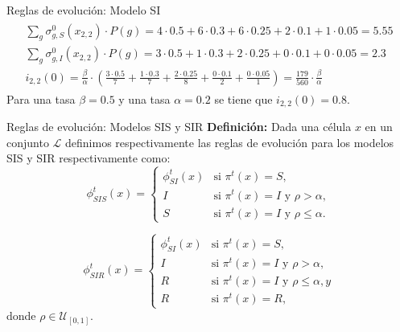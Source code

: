 \documentclass[9pt]{beamer}
\begin{document}
\begin{frame}{Reglas de evolución: Modelo SI}
\begin{align*}
    \begin{array}{l}
        \sum_g\sigma_{g,S}^0(x_{2,2})\cdot P(g) = 4\cdot0.5+6\cdot0.3+6\cdot0.25+2\cdot0.1+1\cdot0.05 = 5.55 \\
        \sum_g\sigma_{g,I}^0(x_{2,2})\cdot P(g) = 3\cdot0.5+1\cdot0.3+2\cdot0.25+0\cdot0.1+0\cdot0.05 = 2.3\\
        i_{2,2}(0) = \frac{\beta}{\alpha}\cdot\left(\frac{3\cdot0.5}{7}+\frac{1\cdot0.3}{7}+\frac{2\cdot0.25}{8}+\frac{0\cdot0.1}{2}+\frac{0\cdot0.05}{1}\right)=\frac{179}{560}\cdot\frac{\beta}{\alpha}
    \end{array}
\end{align*}
Para una tasa $\beta=0.5$ y una tasa $\alpha=0.2$ se tiene que $i_{2,2}(0)=0.8$.
\end{frame}

\begin{frame}{Reglas de evolución: Modelos SIS y SIR}
\textbf{Definición:} Dada una célula $x$ en un conjunto $\mathcal{L}$ definimos respectivamente las reglas de evolución para los modelos SIS y SIR respectivamente como:
\begin{equation}
    \phi_{SIS}^t(x)=\left\{\begin{array}{ll}
        \phi_{SI}^t(x) & \text{si }\pi^t(x) = S,\\
        I & \text{si }\pi^t(x)=I\text{ y }\rho>\alpha,\\
        S & \text{si }\pi^t(x)=I\text{ y }\rho\leq\alpha.
    \end{array}\right.
\end{equation}

\begin{equation}
    \phi_{SIR}^t(x)=\left\{\begin{array}{ll}
        \phi_{SI}^t(x) & \text{si }\pi^t(x) = S,\\
        I & \text{si }\pi^t(x)=I\text{ y }\rho>\alpha,\\
        R & \text{si }\pi^t(x)=I\text{ y }\rho\leq\alpha, y \\
        R & \text{si }\pi^t(x)=R,
    \end{array}\right.
\end{equation}
donde $\rho\in\mathcal{U}_{[0,1]}$.
\end{frame}
\end{document}
